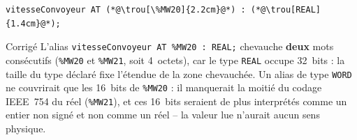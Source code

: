 \begin{UPSTIactivite}

\begin{lstlisting}
vitesseConvoyeur AT (*@\trou[\%MW20]{2.2cm}@*) : (*@\trou[REAL]{1.4cm}@*);
\end{lstlisting}

\begin{UPSTIcorrectionP}{Corrigé}
L'alias \texttt{vitesseConvoyeur AT \%MW20 : REAL;} chevauche \textbf{deux}
mots consécutifs (\texttt{\%MW20} et \texttt{\%MW21}, soit 4~octets), car
le type \texttt{REAL} occupe 32~bits : la taille du type déclaré fixe
l'étendue de la zone chevauchée. Un alias de type \texttt{WORD} ne
couvrirait que les 16~bits de \texttt{\%MW20} : il manquerait la moitié du
codage IEEE~754 du réel (\texttt{\%MW21}), et ces 16~bits seraient de plus
interprétés comme un entier non signé et non comme un réel -- la valeur lue
n'aurait aucun sens physique.
\end{UPSTIcorrectionP}
\end{UPSTIactivite}

